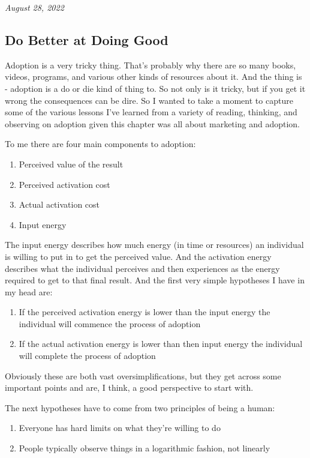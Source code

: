 \documentclass[10pt,a5paper]{book}
\begin{document}
\textit{August 28, 2022}

\subsection{Do Better at Doing Good}
Adoption is a very tricky thing. That's probably why there are so many books, videos, programs, and various other kinds of resources about it. And the thing is - adoption is a do or die kind of thing to. So not only is it tricky, but if you get it wrong the consequences can be dire. So I wanted to take a moment to capture some of the various lessons I've learned from a variety of reading, thinking, and observing on adoption given this chapter was all about marketing and adoption. 

To me there are four main components to adoption:
\begin{enumerate}
\item Perceived value of the result
\item Perceived activation cost
\item Actual activation cost
\item Input energy
\end{enumerate}

The input energy describes how much energy (in time or resources) an individual is willing to put in to get the perceived value. And the activation energy describes what the individual perceives and then experiences as the energy required to get to that final result. And the first very simple hypotheses I have in my head are:
\begin{enumerate}
\item If the perceived activation energy is lower than the input energy the individual will commence the process of adoption
\item If the actual activation energy is lower than then input energy the individual will complete the process of adoption
\end{enumerate}

Obviously these are both vast oversimplifications, but they get across some important points and are, I think, a good perspective to start with. 

The next hypotheses have to come from two principles of being a human:

\begin{enumerate}
\item Everyone has hard limits on what they're willing to do
\item People typically observe things in a logarithmic fashion, not linearly
\end{enumerate}
\end{document}

